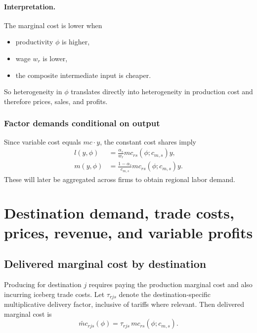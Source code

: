 \documentclass[11pt]{article}
\begin{document}
\paragraph{Interpretation.}
The marginal cost is lower when
\begin{itemize}[leftmargin=*]
    \item productivity \(\phi\) is higher,
    \item wage \(w_r\) is lower,
    \item the composite intermediate input is cheaper.
\end{itemize}
So heterogeneity in \(\phi\) translates directly into heterogeneity in production cost and therefore prices, sales, and profits.

\subsubsection{Factor demands conditional on output}

Since variable cost equals \(mc\cdot y\), the constant cost shares imply
\begin{align}
l(y,\phi) &= \frac{\alpha_s}{w_r}mc_{rs}(\phi;c_{m,s})y, \label{eq:l_demand_final}\\
m(y,\phi) &= \frac{1-\alpha_s}{c_{m,s}}mc_{rs}(\phi;c_{m,s})y. \label{eq:m_demand_final}
\end{align}
These will later be aggregated across firms to obtain regional labor demand.

\section{Destination demand, trade costs, prices, revenue, and variable profits}

\subsection{Delivered marginal cost by destination}

Producing for destination \(j\) requires paying the production marginal cost and also incurring iceberg trade costs. Let \(\tau_{rjs}\) denote the destination-specific multiplicative delivery factor, inclusive of tariffs where relevant. Then delivered marginal cost is
\begin{equation}
\widetilde{mc}_{rjs}(\phi)=\tau_{rjs}\,mc_{rs}(\phi;c_{m,s}).
\label{eq:deliveredmc_final}
\end{equation}
\end{document}
